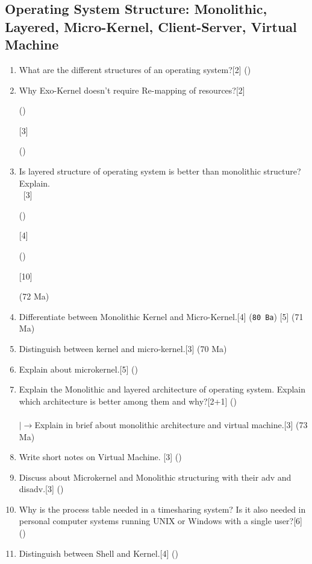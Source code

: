 \documentclass[12pt]{article}
\newcommand{\lb}{\\$\left|\rightarrow\right.$}
\newcommand{\enter}{\\\textcolor{white}{1}}
\begin{document}
	\subsection{Operating System Structure: Monolithic, Layered, Micro-Kernel, Client-Server, Virtual Machine}
	\begin{enumerate}
	\item What are the different structures of an operating system?\hfill[2] ()
	\item Why Exo-Kernel doesn't require Re-mapping of resources?\hfill[2] \begin{small}()\end{small} [3] \begin{small}()\end{small}
	\item Is layered structure of operating system is better than monolithic structure? Explain.
	\enter \hfill[3] \begin{small}()\end{small} [4] \begin{small}()\end{small} [10] \begin{small}(72 Ma)\end{small}
	\item Differentiate between Monolithic Kernel and Micro-Kernel.\hfill[4] (\texttt{80 Ba}) [5] (71 Ma)
	\item Distinguish between kernel and micro-kernel.\hfill[3] (70 Ma)
	\item Explain about microkernel.\hfill[5] ()
	\item Explain the Monolithic and layered architecture of operating system. Explain which architecture is better among them and why?\hspace{6.7cm}[2+1] ()\\
	\lb Explain in brief about monolithic architecture and virtual machine.\hfill[3] (73 Ma)

	\item Write short notes on Virtual Machine. \hfill [3] ()

	\item Discuss about Microkernel and Monolithic structuring with their adv and disadv.[3] () 
	\item Why is the process table needed in a timesharing system? Is it also needed in personal computer systems running UNIX or Windows with a single user?\hfill[6] ()
	\item Distinguish between Shell and Kernel.\hfill[4] ()
	\end{enumerate}
\end{document}
